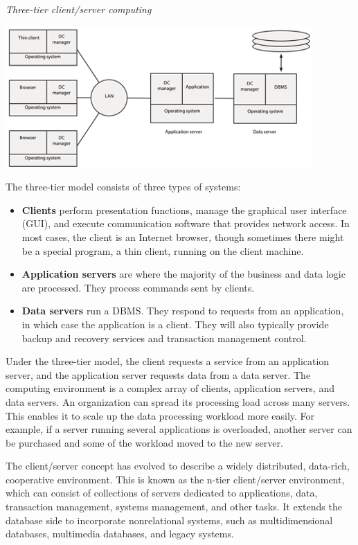 \documentclass[
]{article}
\begin{document}
\emph{Three-tier client/server computing}

\includegraphics{Figures/Chapter 21/three-tier-computing.png}

The three-tier model consists of three types of systems:

\begin{itemize}
\item
  \textbf{Clients} perform presentation functions, manage the graphical
  user interface (GUI), and execute communication software that
  provides network access. In most cases, the client is an Internet
  browser, though sometimes there might be a special program, a thin
  client, running on the client machine.
\item
  \textbf{Application servers} are where the majority of the business and
  data logic are processed. They process commands sent by clients.
\item
  \textbf{Data servers} run a DBMS. They respond to requests from an
  application, in which case the application is a client. They will
  also typically provide backup and recovery services and transaction
  management control.
\end{itemize}

Under the three-tier model, the client requests a service from an
application server, and the application server requests data from a data
server. The computing environment is a complex array of clients,
application servers, and data servers. An organization can spread its
processing load across many servers. This enables it to scale up the
data processing workload more easily. For example, if a server running
several applications is overloaded, another server can be purchased and
some of the workload moved to the new server.

The client/server concept has evolved to describe a widely distributed,
data-rich, cooperative environment. This is known as the n-tier
client/server environment, which can consist of collections of servers
dedicated to applications, data, transaction management, systems
management, and other tasks. It extends the database side to incorporate
nonrelational systems, such as multidimensional databases, multimedia
databases, and legacy systems.
\end{document}
